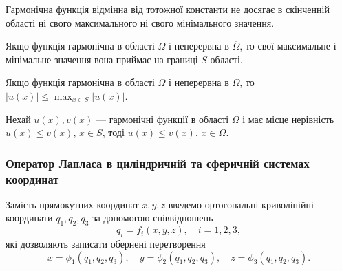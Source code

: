 \begin{corollary}
	Гармонічна функція відмінна від тотожної константи не досягає в скінченній області ні свого максимального ні свого мінімального значення.
\end{corollary}

\begin{corollary}
	Якщо функція гармонічна в області $\Omega$ і неперервна в $\overline{\Omega}$, то свої максимальне і мінімальне значення вона приймає на границі $S$ області.
\end{corollary}

\begin{corollary}
	Якщо функція гармонічна в області $\Omega$ і неперервна в $\overline{\Omega}$, то $|u(x)| \le \max_{x \in S} |u(x)|$.
\end{corollary}

\begin{corollary}
	Нехай $u(x), v(x)$ --- гармонічні функції в області $\Omega$ і має місце нерівність $u(x) \le v(x)$, $x \in S$, тоді $u(x) \le v(x)$, $x \in \Omega$.
\end{corollary}

\subsubsection{Оператор Лапласа в циліндричній та сферичній системах координат}

Замість прямокутних координат $x, y, z$ введемо ортогональні криволінійні координати $q_1, q_2, q_3$ за допомогою співвідношень
\begin{equation}
	q_i = f_i(x, y, z), \quad i = 1, 2, 3,
\end{equation}
які дозволяють записати обернені перетворення 
\begin{equation}
	\label{eq:4.5.16}
	x = \phi_1(q_1, q_2, q_3), \quad y = \phi_2(q_1, q_2, q_3), \quad z = \phi_3(q_1, q_2, q_3).
\end{equation}

